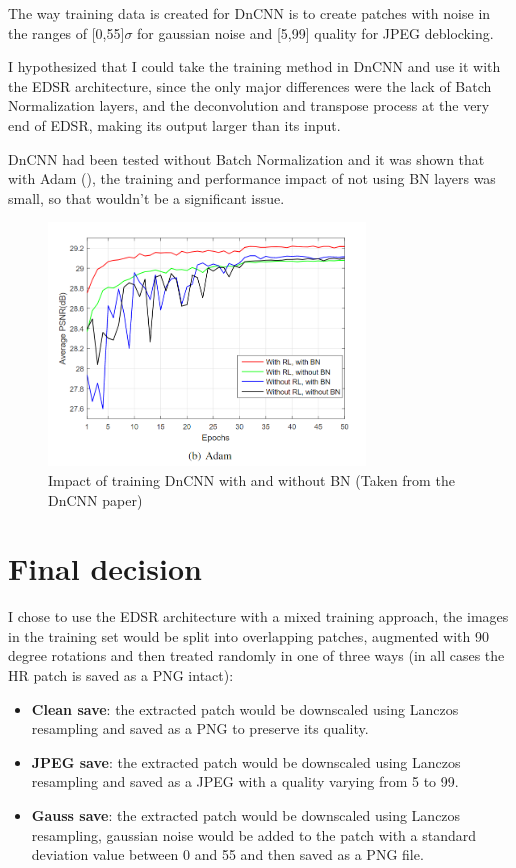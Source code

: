 \hfill

The way training data is created for DnCNN is to create patches with noise in the ranges of [0,55]$\sigma$ for gaussian noise and [5,99] quality for JPEG deblocking.

\hfill

I hypothesized that I could take the training method in DnCNN and use it with the EDSR architecture, since the only major differences were the lack of Batch Normalization layers, and the deconvolution and transpose process at the very end of EDSR, making its output larger than its input.

\hfill

DnCNN had been tested without Batch Normalization and it was shown that with Adam (\cite{Adam}), the training and performance impact of not using BN layers was small, so that wouldn't be a significant issue.

\begin{figure}[H]
\centering
\includegraphics[width=0.75\textwidth]{../Figures/DnCNNAdam}
\caption{Impact of training DnCNN with and without BN (Taken from the DnCNN paper)}
\end{figure}

\section{Final decision}

I chose to use the EDSR architecture with a mixed training approach, the images in the training set would be split into overlapping patches, augmented with 90 degree rotations and then treated randomly in one of three ways (in all cases the HR patch is saved as a PNG intact):

\hfill

\begin{itemize}
    \item \textbf{Clean save}: the extracted patch would be downscaled using Lanczos resampling and saved as a PNG to preserve its quality.
    \item \textbf{JPEG save}: the extracted patch would be downscaled using Lanczos resampling and saved as a JPEG with a quality varying from 5 to 99.
    \item \textbf{Gauss save}: the extracted patch would be downscaled using Lanczos resampling, gaussian noise would be added to the patch with a standard deviation value between 0 and 55 and then saved as a PNG file.
\end{itemize}

